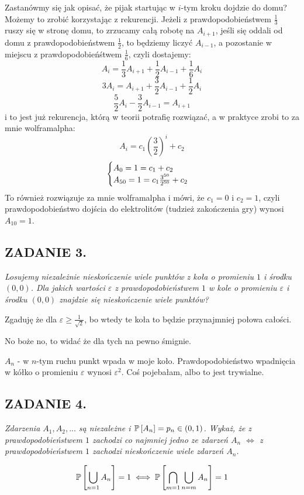 \documentclass{article}
\begin{document}
Zastanówmy się jak opisać, że pijak startując w $i$-tym kroku dojdzie do domu? 
Możemy to zrobić korzystając z rekurencji. Jeżeli z prawdopodobieństwem $\frac13$ ruszy się w stronę domu, to zrzucamy całą robotę na $A_{i+1}$, jeśli się oddali od domu z prawdopodobieństwem $\frac12$, to będziemy liczyć $A_{i-1}$, a pozostanie w miejscu z prawdopodobieńśtwem $\frac16$, czyli dostajemy:
$$A_i=\frac13A_{i+1}+\frac12A_{i-1}+\frac16A_i$$
$$3A_i=A_{i+1}+\frac32A_{i-1}+\frac12A_i$$
$$\frac52A_i-\frac32A_{i-1}=A_{i+1}$$
i to jest już rekurencja, którą w teorii potrafię rozwiązać, a w praktyce zrobi to za mnie wolframalpha:
$$A_i=c_1\left(\frac32\right)^i+c_2$$
$$\begin{cases}A_0=1=c_1+c_2\\A_{50}=1=c_1{3^{50}\over 2^{50}}+c_2\end{cases}$$
To również rozwiązuje za mnie wolframalpha i mówi, że $c_1=0$ i $c_2=1$, czyli prawdopodobieństwo dojścia do elektrolitów (tudzież zakończenia gry) wynosi $A_{10}=1$.


\subsection*{ZADANIE 3.}
\emph{\color{yellow}Losujemy niezależnie nieskończenie wiele punktów z koła o promieniu $1$ i środku $(0, 0)$. Dla jakich wartości $\varepsilon$ z prawdopodobieństwem $1$ w kole o promieniu $\varepsilon$ i środku $(0, 0)$ znajdzie się nieskończenie wiele punktów?}
\smallskip

Zgaduję że dla $\varepsilon\geq\frac1{\sqrt2}$, bo wtedy te koła to będzie przynajmniej połowa całości.

No boże no, to widać że dla tych na pewno śmignie.

$A_n$ - w $n$-tym ruchu punkt wpada w moje koło. Prawdopodobieństwo wpadnięcia w kółko o promieniu $\varepsilon$ wynosi $\varepsilon^2$.
Coś pojebałam, albo to jest trywialne.


\subsection*{ZADANIE 4.}
\emph{\color{yellow}Zdarzenia $A_1,A_2,...$ są niezależne i $\mathbb{P}\left[A_n\right]=p_n\in(0,1)$. Wykaż, że z prawdopodobieństwem $1$ zachodzi co najmniej jedno ze zdarzeń $A_n$ $\iff$ z prawdopodobieństwem $1$ zachodzi nieskończenie wiele zdarzeń $A_n$.}
\smallskip

$$\mathbb{P}\left[\bigcup\limits_{n=1}A_n\right]=1\iff\mathbb{P}\left[\bigcap\limits_{m=1}\bigcup\limits_{n=m}A_n\right]=1$$
\end{document}
